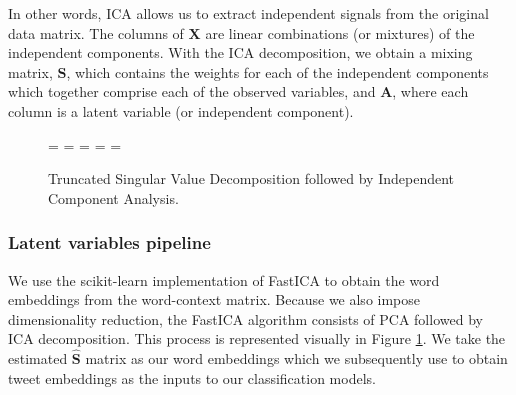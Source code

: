 \documentclass{article}
\begin{document}
In other words, ICA allows us to extract independent signals from the
original data matrix. The columns of \(\mathbf{X}\) are linear
combinations (or mixtures) of the independent components. With the ICA
decomposition, we obtain a mixing matrix, \(\mathbf{S}\), which contains
the weights for each of the independent components which together
comprise each of the observed variables, and \(\mathbf{A}\), where each
column is a latent variable (or independent component).

\begin{figure}
  \centering
   = 
   
  \newline
  \newline
  \newline
    = 
  \newline
  \newline
  \newline
  {} = 
   
  \newline
  \newline
  \newline
   = 
   
  \newline
  \newline
  \newline
   = 
   
  \caption{Truncated Singular Value Decomposition followed by Independent Component Analysis.}
  \label{fig:matdec}
\end{figure}

\hypertarget{latent-variables-pipeline}{%
\subsubsection{Latent variables
pipeline}\label{latent-variables-pipeline}}

\label{sec:LVpipe} We use the scikit-learn implementation of FastICA to
obtain the word embeddings from the word-context matrix. Because we also
impose dimensionality reduction, the FastICA algorithm consists of PCA
followed by ICA decomposition. This process is represented visually in
Figure \ref{fig:matdec}. We take the estimated \(\mathbf{\hat{S}}\)
matrix as our word embeddings which we subsequently use to obtain tweet
embeddings as the inputs to our classification models.
\end{document}

